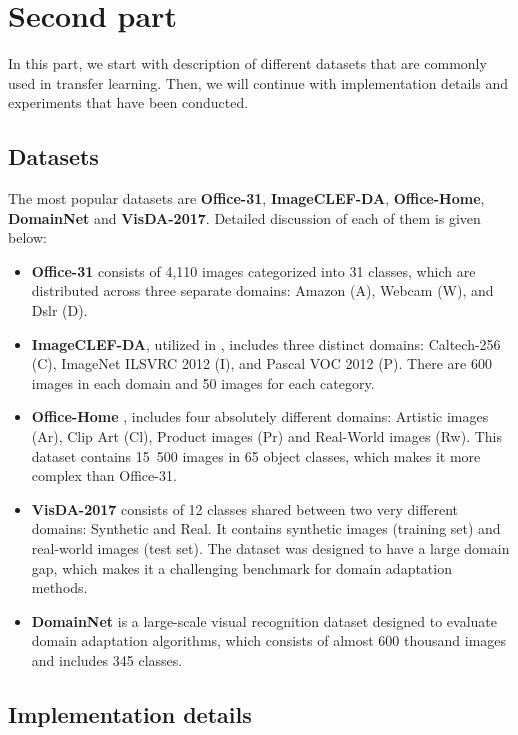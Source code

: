 \section{Second part} \label{section: copy me}

In this part, we start with description of different datasets that are commonly used in transfer learning. Then, we will continue with implementation details and experiments that have been conducted.

\subsection{Datasets}

The most popular datasets are \textbf{Office-31}, \textbf{ImageCLEF-DA}, \textbf{Office-Home}, \textbf{DomainNet} and \textbf{VisDA-2017}. Detailed discussion of each of them is given below:

\begin{itemize}
    \item \textbf{Office-31} \cite{saenko2010adapting} consists of 4,110 images categorized into 31 classes, which are distributed across three separate domains: Amazon (A), Webcam (W), and Dslr (D).
    \item \textbf{ImageCLEF-DA}, utilized in \cite{long2017deep}, includes three distinct domains: Caltech-256 (C), ImageNet ILSVRC 2012 (I), and Pascal VOC 2012 (P). There are 600 images in each domain and 50 images for each category.
    \item \textbf{Office-Home} \cite{venkateswara2017deep}, includes four absolutely different domains: Artistic images (Ar), Clip Art (Cl), Product images (Pr) and Real-World images (Rw). This dataset contains 15~500 images in 65 object classes, which makes it more complex than Office-31.
    \item \textbf{VisDA-2017} \cite{peng2017visda} consists of 12 classes shared between two very different domains: Synthetic and Real. It contains synthetic images (training set) and real-world images (test set). The dataset was designed to have a large domain gap, which makes it a challenging benchmark for domain adaptation methods.
    \item \textbf{DomainNet} \cite{peng2019moment} is a large-scale visual recognition dataset designed to evaluate domain adaptation algorithms, which consists of almost 600 thousand images and includes 345 classes.
\end{itemize}

\subsection{Implementation details}

